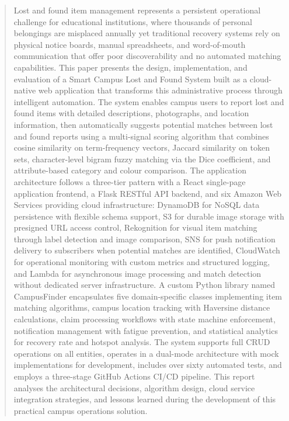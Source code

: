 \documentclass[conference]{IEEEtran}
\begin{document}
\begin{abstract}
Lost and found item management represents a persistent operational challenge for educational institutions, where thousands of personal belongings are misplaced annually yet traditional recovery systems rely on physical notice boards, manual spreadsheets, and word-of-mouth communication that offer poor discoverability and no automated matching capabilities. This paper presents the design, implementation, and evaluation of a Smart Campus Lost and Found System built as a cloud-native web application that transforms this administrative process through intelligent automation. The system enables campus users to report lost and found items with detailed descriptions, photographs, and location information, then automatically suggests potential matches between lost and found reports using a multi-signal scoring algorithm that combines cosine similarity on term-frequency vectors, Jaccard similarity on token sets, character-level bigram fuzzy matching via the Dice coefficient, and attribute-based category and colour comparison. The application architecture follows a three-tier pattern with a React single-page application frontend, a Flask RESTful API backend, and six Amazon Web Services providing cloud infrastructure: DynamoDB for NoSQL data persistence with flexible schema support, S3 for durable image storage with presigned URL access control, Rekognition for visual item matching through label detection and image comparison, SNS for push notification delivery to subscribers when potential matches are identified, CloudWatch for operational monitoring with custom metrics and structured logging, and Lambda for asynchronous image processing and match detection without dedicated server infrastructure. A custom Python library named CampusFinder encapsulates five domain-specific classes implementing item matching algorithms, campus location tracking with Haversine distance calculations, claim processing workflows with state machine enforcement, notification management with fatigue prevention, and statistical analytics for recovery rate and hotspot analysis. The system supports full CRUD operations on all entities, operates in a dual-mode architecture with mock implementations for development, includes over sixty automated tests, and employs a three-stage GitHub Actions CI/CD pipeline. This report analyses the architectural decisions, algorithm design, cloud service integration strategies, and lessons learned during the development of this practical campus operations solution.
\end{abstract}
\end{document}
